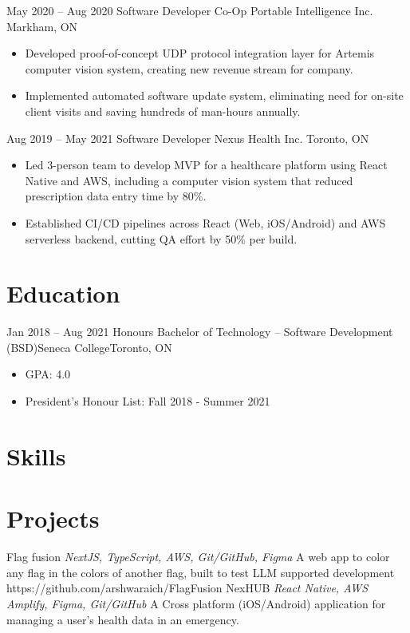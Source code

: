 \documentclass[letterpaper]{moderncv}
\begin{document}
\cventry
{May 2020 -- Aug 2020}
{Software Developer Co-Op}
{Portable Intelligence Inc.}
{Markham, ON}
{}
{\begin{itemize}%
	\item Developed proof-of-concept UDP protocol integration layer for Artemis computer vision system, creating new revenue stream for company.
	\item Implemented automated software update system, eliminating need for on-site client visits and saving hundreds of man-hours annually.
	\end{itemize}}
\cventry
{Aug 2019 -- May 2021}
{Software Developer}
{Nexus Health Inc.}
{Toronto, ON}
{}
{\begin{itemize}%
	\item Led 3-person team to develop MVP for a healthcare platform using React Native and AWS, including a computer vision system that reduced prescription data entry time by 80\%.
    \item Established CI/CD pipelines across React (Web, iOS/Android) and AWS serverless backend, cutting QA effort by 50\% per build.
	\end{itemize}}

\section{Education}
\cventry
{Jan 2018 -- Aug 2021}
{Honours Bachelor of Technology – Software Development (BSD)}{Seneca College}{Toronto, ON}{}
{\begin{itemize}%
	\item GPA: 4.0
	\item President's Honour List: Fall 2018 - Summer 2021
	\end{itemize}}

\section{Skills}
\section{Projects}
\cventry
{}
{Flag fusion}
{}
{\textit{NextJS, TypeScript, AWS, Git/GitHub, Figma}}
{}
{A web app to color any flag in the colors of another flag, built to test LLM supported development\\https://github.com/arshwaraich/FlagFusion}
\vspace{1mm}
\cventry
{}
{NexHUB}
{}
{\textit{React Native, AWS Amplify, Figma, Git/GitHub}}
{}
{A Cross platform (iOS/Android) application for managing a user's health data in an emergency.}
\vspace{1mm}
\end{document}
